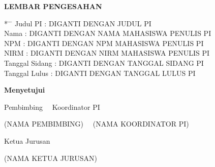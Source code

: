 \newpage
{}
\begin{center}
{\large \bf \centering LEMBAR PENGESAHAN}
\end{center}

\vspace{0.75cm}

\begin{tabbing}*
  \hspace{3.5cm}\=\hspace{0.25cm}  \=\hspace{0.5cm} \kill
  Judul PI \> : \> DIGANTI DENGAN JUDUL PI \\
  Nama \> : \> DIGANTI DENGAN NAMA MAHASISWA PENULIS PI \\
  NPM \> : \> DIGANTI DENGAN NPM MAHASISWA PENULIS PI \\
  NIRM \> : \> DIGANTI DENGAN NIRM MAHASISWA PENULIS PI \\
  Tanggal Sidang \> : \> DIGANTI DENGAN TANGGAL SIDANG PI \\
  Tanggal Lulus \> : \> DIGANTI DENGAN TANGGAL LULUS PI
\end{tabbing}


\begin{center}
\vspace{1cm}

{\bf Menyetujui}

\vspace{0.5cm}

{Pembimbing~ \hspace{5.0cm} ~Koordinator PI}%

\vspace{2.0cm}

{(NAMA PEMBIMBING)~ \hfill ~(NAMA KOORDINATOR PI)}%

\vspace{0.5cm}

 Ketua Jurusan\\
 \vspace{2.0cm}

(NAMA KETUA JURUSAN)

\end{center}
